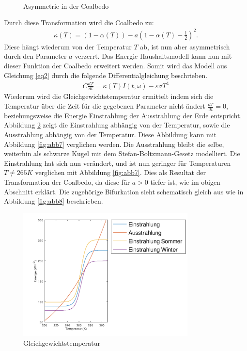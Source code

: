 \begin{refsection}
\begin{figure}
	\caption[Asymmetrie in der Coalbedo]{Asymmetrie in der Coalbedo}
	\label{fig:abb10}
\end{figure}
%
Durch diese Transformation wird die Coalbedo zu:
\begin{eqnarray*}
\kappa(T)=(1-\alpha(T)) - a \left( 1-\alpha(T) - \frac{1}{2} \right)^2.
\end{eqnarray*}
Diese hängt wiederum von der Temperatur $T$ ab, ist nun aber
asymmetrisch durch den Parameter $a$ verzerrt. Das Energie
Haushaltsmodell kann nun mit dieser Funktion der Coalbedo erweitert
werden. Somit wird das Modell aus Gleichung \ref{eq2} durch die
folgende Differentialgleichung beschrieben.
\begin{eqnarray} \label{eq5}
C \frac{d T}{d t} =  \kappa(T) I(t, \omega) - \varepsilon \sigma T^4
\end{eqnarray}
Wiederum wird die Gleichgewichtstemperatur ermittelt indem sich die
Temperatur über die Zeit für die gegebenen Parameter nicht ändert
$\frac{d T}{d t}=0$, beziehungsweise die Energie Einstrahlung der
Ausstrahlung der Erde entspricht. Abbildung \ref{fig:abb11} zeigt
die Einstrahlung abhängig von der Temperatur, sowie die Ausstrahlung
abhängig von der Temperatur. Diese Abbildung kann mit Abbildung
\ref{fig:abb7} verglichen werden. Die Ausstrahlung bleibt die selbe,
weiterhin als schwarze Kugel mit dem Stefan-Boltzmann-Gesetz
modelliert. Die Einstrahlung hat sich nun verändert, und ist nun
geringer für Temperaturen $T \neq 265 K$ verglichen mit Abbildung
\ref{fig:abb7}. Dies als Resultat der Transformation der Coalbedo,
da diese für $a>0$ tiefer ist, wie im obigen Abschnitt erklärt. Die
zugehörige Bifurkation sieht schematisch gleich aus wie in Abbildung
\ref{fig:abb8} beschrieben.
%
\begin{figure}
	\centering
	\includegraphics[width= 0.8\textwidth]{neigung/Strahlung_3.png}
	\caption[Gleichgewichtstemperatur]{Gleichgewichtstemperatur}
	\label{fig:abb11}
\end{figure}
%


\end{refsection}
